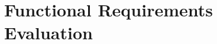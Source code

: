 \documentclass[12pt, titlepage]{article}
\begin{document}
\section{Functional Requirements Evaluation}
\end{document}
